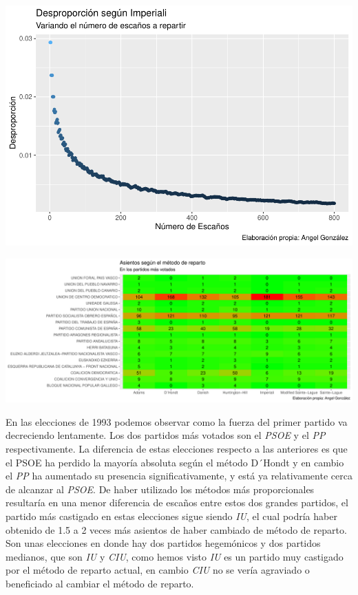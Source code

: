 \documentclass[12pt,a4paper,]{book}
\numberwithin{dummy}{section}
\theoremstyle{ocrenumbox}
\theoremstyle{blacknumex}
\theoremstyle{blacknumbox}
\theoremstyle{ocrenum}
\theoremstyle{ocrenum}
\begin{document}
\begin{center}\includegraphics[width=1\linewidth]{figurasR/unnamed-chunk-20-1} \end{center}

\begin{center}\includegraphics[width=1\linewidth]{figurasR/unnamed-chunk-20-2} \end{center}

En las elecciones de 1993 podemos observar como la fuerza del primer
partido va decreciendo lentamente. Los dos partidos más votados son el
\emph{PSOE} y el \emph{PP} respectivamente. La diferencia de estas
elecciones respecto a las anteriores es que el PSOE ha perdido la
mayoría absoluta según el método D´Hondt y en cambio el \emph{PP} ha
aumentado su presencia significativamente, y está ya relativamente cerca
de alcanzar al \emph{PSOE}. De haber utilizado los métodos más
proporcionales resultaría en una menor diferencia de escaños entre estos
dos grandes partidos, el partido más castigado en estas elecciones sigue
siendo \emph{IU}, el cual podría haber obtenido de 1.5 a 2 veces más
asientos de haber cambiado de método de reparto. Son unas elecciones en
donde hay dos partidos hegemónicos y dos partidos medianos, que son
\emph{IU} y \emph{CIU}, como hemos visto \emph{IU} es un partido muy
castigado por el método de reparto actual, en cambio \emph{CIU} no se
vería agraviado o beneficiado al cambiar el método de reparto.
\end{document}

